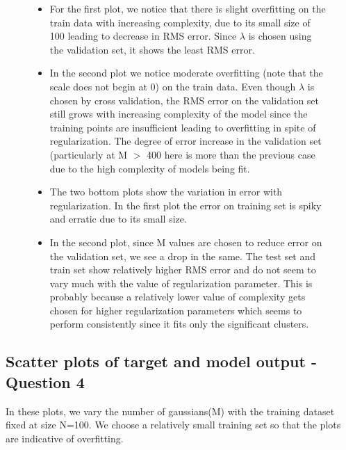 \documentclass{article}
\begin{document}
\begin{figure}[H]
\begin{itemize}
\item For the first plot, we notice that there is slight overfitting on the train data with increasing complexity, due to its small size of 100 leading to decrease in RMS error. Since $\lambda$ is chosen using the validation set, it shows the least RMS error.
\item  In the second plot we notice moderate overfitting (note that the scale does not begin at 0) on the train data. Even though $\lambda$ is chosen by cross validation, the RMS error on the validation set still grows with increasing complexity of the model since the training points are insufficient leading to overfitting in spite of regularization. The degree of error increase in the validation set (particularly at M $>$ 400 here is more than the previous case due to the high complexity of models being fit.
\item The two bottom plots show the variation in error with regularization. In the first plot the error on training set is spiky and erratic due to its small size. 
\item In the second plot, since M values are chosen to reduce error on the validation set, we see a drop in the same. The test set and train set show relatively higher RMS error and do not seem to vary much with the value of regularization parameter. This is probably because a relatively lower value of complexity gets chosen for higher regularization parameters which seems to perform consistently since it fits only the significant clusters.
\end{itemize}


\end{figure}



\subsection{Scatter plots of target and model output - Question 4}

In these plots, we vary the number of gaussians(M) with the training dataset fixed at size N=100. We choose a relatively small training set so that the plots are indicative of overfitting.
\end{document}
